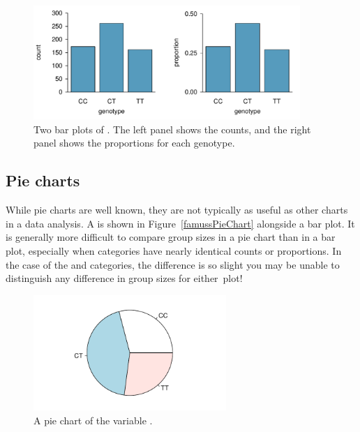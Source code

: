 \begin{figure}[h]
	\centering
	\includegraphics[width=0.9\textwidth]{ch_01a_intro_to_data_oi_biostat/figures/famussBarPlot/famussBarPlot}
	\caption{Two bar plots of . The left panel shows the counts, and the right panel shows the proportions for each genotype.}
	\label{famussBarPlot}
\end{figure}


\subsection{Pie charts}


While pie charts are well known, they are not typically as useful as other charts in a data analysis. A  is shown in Figure~\vref{famussPieChart} alongside a bar plot. It is generally more difficult to compare group sizes in a pie chart than in a bar plot, especially when categories have nearly identical counts or proportions. In the case of the  and  categories, the difference is so slight you may be unable to distinguish any difference in group sizes for either~plot!

\begin{figure}[h]
	\centering
	\includegraphics[width=0.65\textwidth]{ch_01a_intro_to_data_oi_biostat/figures/famussPieChart/famussPieChart}
	\caption{A pie chart of the variable . }
	\label{famussPieChart}
\end{figure}


